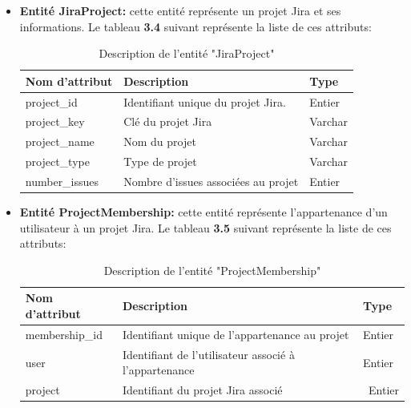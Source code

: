 \begin{itemize}
\begin{center}
            \end{center}
            \vspace{-1cm}
        \item \textbf{Entité JiraProject:} cette entité représente un projet Jira et ses informations.
        Le tableau \textbf{3.4} suivant représente la liste de ces attributs:
        \begin{center}   
                \begin{longtable}{|p{3cm}|p{11cm}|p{2cm}|}
                    \caption {Description de l'entité "JiraProject"} \\
                    \hline
                    \rowcolor{blue!18}\textbf{\large{Nom d'attribut}} & \textbf{\large{Description}} & \textbf{\large{Type}} \\
                    \hline
                    project\_id& Identifiant unique du projet Jira.&  Entier\\\hline
                    project\_key& Clé du projet Jira& Varchar\\\hline 
                    project\_name&Nom du projet & Varchar\\\hline
                    project\_type& Type de projet &Varchar\\\hline
                    number\_issues&Nombre d'issues associées au projet &Entier \\\hline
                                        

                \end{longtable}
               
            \end{center}
            \vspace{-1cm}
        \item \textbf{Entité ProjectMembership:} cette entité représente l'appartenance d'un utilisateur à un projet Jira.
        Le tableau \textbf{3.5} suivant représente la liste de ces attributs:
        \begin{center}   
                \begin{longtable}{|p{3cm}|p{11cm}|p{2cm}|}
                    \caption {Description de l'entité "ProjectMembership"} \\
                    \hline
                    \rowcolor{blue!18}\textbf{\large{Nom d'attribut}} & \textbf{\large{Description}} & \textbf{\large{Type}} \\
                    \hline
                    membership\_id& Identifiant unique de l'appartenance au projet &  Entier\\\hline
                    user& Identifiant de l'utilisateur associé à l'appartenance& Entier\\\hline
                    project& Identifiant du projet Jira associé&\ Entier\\\hline
                                        


\end{longtable}
\end{center}
\end{itemize}
